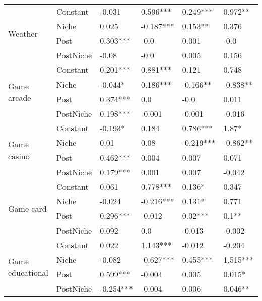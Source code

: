 \begin{longtable}[h!]{llllll}
\cline{1-6}
\multirow{4}{*}{Weather} & Constant &              -0.031 &    0.596*** &   0.249*** &    0.972** \\
          & Niche &               0.025 &   -0.187*** &    0.153** &      0.376 \\
          & Post &            0.303*** &        -0.0 &      0.001 &       -0.0 \\
          & PostNiche &               -0.08 &        -0.0 &      0.005 &      0.156 \\
\cline{1-6}
\multirow{4}{*}{Game arcade} & Constant &            0.201*** &    0.881*** &      0.121 &      0.748 \\
          & Niche &             -0.044* &    0.186*** &   -0.166** &   -0.838** \\
          & Post &            0.374*** &         0.0 &       -0.0 &      0.011 \\
          & PostNiche &            0.198*** &      -0.001 &     -0.001 &     -0.016 \\
\cline{1-6}
\multirow{4}{*}{Game casino} & Constant &             -0.193* &       0.184 &   0.786*** &      1.87* \\
          & Niche &                0.01 &        0.08 &  -0.219*** &   -0.862** \\
          & Post &            0.462*** &       0.004 &      0.007 &      0.071 \\
          & PostNiche &            0.179*** &       0.001 &      0.007 &     -0.042 \\
\cline{1-6}
\multirow{4}{*}{Game card} & Constant &               0.061 &    0.778*** &     0.136* &      0.347 \\
          & Niche &              -0.024 &   -0.216*** &     0.131* &      0.771 \\
          & Post &            0.296*** &      -0.012 &    0.02*** &      0.1** \\
          & PostNiche &               0.092 &         0.0 &     -0.013 &     -0.002 \\
\cline{1-6}
\multirow{4}{*}{Game educational} & Constant &               0.022 &    1.143*** &     -0.012 &     -0.204 \\
          & Niche &              -0.082 &   -0.627*** &   0.455*** &   1.515*** \\
          & Post &            0.599*** &      -0.004 &      0.005 &     0.015* \\
          & PostNiche &           -0.254*** &      -0.004 &      0.006 &    0.046** \\

\end{longtable}
